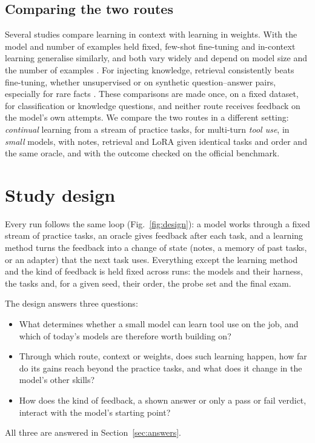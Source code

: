 \documentclass[a4paper,fleqn]{cas-dc}
\begin{document}
\subsection{Comparing the two routes}\label{sec:rw-position}
Several studies compare learning in context with learning in weights. With the model and number of examples held
fixed, few-shot fine-tuning and in-context learning generalise similarly, and both vary widely and depend on model size and
the number of examples \citep{mosbach2023few}. For injecting knowledge, retrieval consistently beats fine-tuning, whether unsupervised
\citep{ovadia2024fine} or on synthetic question--answer pairs, especially for rare facts \citep{soudani2024fine}. These
comparisons are made once, on a fixed dataset, for classification or knowledge questions, and neither route receives feedback on the model's own
attempts. We compare the two routes in a
different setting: \emph{continual} learning from a stream of practice tasks, for multi-turn \emph{tool use}, in
\emph{small} models, with notes, retrieval and LoRA given identical tasks and order and the same oracle, and with the
outcome checked on the official benchmark.

\section{Study design}\label{sec:design}
Every run follows the same loop (Fig.~\ref{fig:design}): a model works through a fixed stream of practice tasks, an
oracle gives feedback after each task, and a learning method turns the feedback into a change of state (notes, a memory
of past tasks, or an adapter) that the next task uses. Everything except the learning method and the kind of feedback is
held fixed across runs: the models and their harness, the tasks and, for a given seed, their order, the probe set and the final exam.

The design answers three questions:
\begin{itemize}[leftmargin=2.6em,itemsep=1pt,topsep=3pt]
\item[\textbf{RQ1}] What determines whether a small model can learn tool use on the job, and which of today's models
  are therefore worth building on?
\item[\textbf{RQ2}] Through which route, context or weights, does such learning happen, how far do its gains reach
  beyond the practice tasks, and what does it change in the model's other skills?
\item[\textbf{RQ3}] How does the kind of feedback, a shown answer or only a pass or fail verdict, interact with the
  model's starting point?
\end{itemize}
All three are answered in Section~\ref{sec:answers}.
\end{document}
